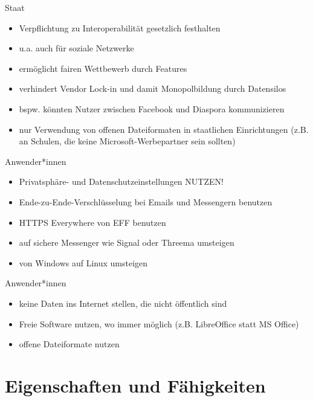 \documentclass{beamer}
\begin{document}
\begin{frame}{Staat}
    \begin{itemize}
        \item Verpflichtung zu Interoperabilität gesetzlich festhalten
        \vfill
        \item u.a. auch für soziale Netzwerke
        \vfill
        \item ermöglicht fairen Wettbewerb durch Features
        \vfill
        \item verhindert Vendor Lock-in und damit Monopolbildung durch Datensilos
        \vfill
        \item bspw. könnten Nutzer zwischen Facebook und Diaspora kommunizieren
        \vfill
        \item nur Verwendung von offenen Dateiformaten in staatlichen
              Einrichtungen (z.B. an Schulen, die keine Microsoft-Werbepartner
              sein sollten)
    \end{itemize}
\end{frame}

\begin{frame}{Anwender*innen}
    \begin{itemize}
        \item Privatsphäre- und Datenschutzeinstellungen NUTZEN!
        \vfill
        \item Ende-zu-Ende-Verschlüsselung bei Emails und Messengern benutzen
        \vfill
        \item HTTPS Everywhere von EFF benutzen
        \vfill
        \item auf sichere Messenger wie Signal oder Threema umsteigen
        \vfill
        \item von Windows auf Linux umsteigen
    \end{itemize}
\end{frame}

\begin{frame}{Anwender*innen}
    \begin{itemize}
        \item keine Daten ins Internet stellen, die nicht öffentlich sind
        \vfill
        \item Freie Software nutzen, wo immer möglich (z.B. LibreOffice statt
              MS Office)
        \vfill
        \item offene Dateiformate nutzen
    \end{itemize}
\end{frame}

\section{Eigenschaften und Fähigkeiten}
\end{document}
